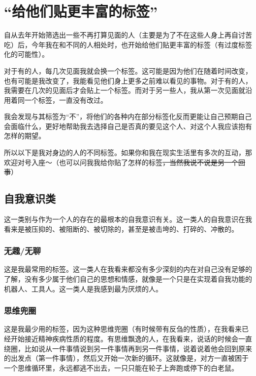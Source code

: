 \chapter{“给他们贴更丰富的标签”}







自从去年开始筛选出一些不再打算见面的人（主要是为了不在这些人身上再自讨苦吃）后，今年我在和不同的人相处时，也开始给他们贴更丰富的标签（有过度标签化的可能性）。

对于有的人，每几次见面我就会换一个标签。这可能是因为他们在随着时间改变，也有可能是我改变了，我能看见他们身上更多之前难以看见的事物。对于有的人，我需要在几次的见面后才会贴上一个标签。而对于另一些人，我从第一次见面就沿用着同一个标签，一直没有改过。

我会发现与其标签为“不”，将他们的各种内在部分标签化反而更能让自己预期自己会面临什么，更好地帮助我去选择自己是否真的要见这个人、对这个人我应该抱有怎样的期望。

所以以下是我对身边的人的不同标签。如果你和我在现实生活里有多次的互动，那欢迎对号入座～（也可以问我我给你贴了怎样的标签\sout{，当然我说不说是另一个回事}）


\section*{自我意识类}

这一类别与作为一个人的存在的最根本的自我意识有关。这一类人的自我意识在我看来是被压抑的、被阻断的、被切除的，甚至是被击垮的、打碎的、冲散的。

\subsection*{无趣/无聊}

这是我最常用的标签。这一类人在我看来都没有多少深刻的内在\pozhehao{}对自己没有足够的了解，没有多少属于他们自己的思想和情感，就像是一个只是在实现着自我功能的机器人、工具人。这一类人是我感到最为厌烦的人。

\subsection*{思维兜圈}

这是我最少用的标签，因为这种思维兜圈（有时候带有反刍的性质），在我看来已经开始接近精神疾病性质的程度。有思维飘逸的人，在我看来，说话的时候会一直绕圈，比如说从一件事情说到另一件事情再到另一件事情，说着说着他会回到原来的出发点（第一件事情），然后又开始一次新的循环。这就像是，对方一直被困于一个思维循环里，永远都逃不出去，一只只能在轮子上奔跑或停下的白老鼠。


